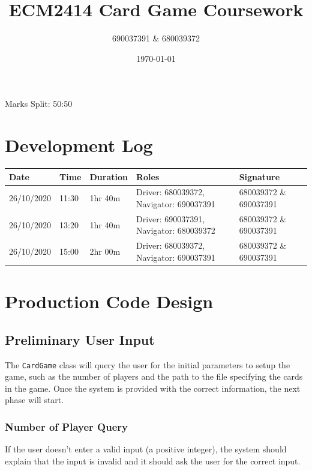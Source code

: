 \documentclass[a4paper, 11pt] {article}
\begin{document}
\title{ECM2414 Card Game Coursework}
\author{690037391 \& 680039372}
\date{\today}
\maketitle
	\begin{center}
		Marks Split: 50:50
	\end{center}
\pagebreak
\section*{Development Log}
\begin{center}
\begin{table}[H]
\begin{tabular}{|l|l|l|l|l|}
\hline
Date           & Time     & Duration  & Roles                                                 & Signature                       \\ \hline
 26/10/2020 & 11:30    & 1hr 40m  & Driver: 680039372, Navigator: 690037391 & 680039372 \& 690037391 \\ \hline
 26/10/2020 & 13:20    & 1hr 40m  & Driver: 690037391, Navigator: 680039372 & 680039372 \& 690037391 \\ \hline
 26/10/2020 & 15:00    & 2hr 00m & Driver: 680039372, Navigator: 690037391 & 680039372 \& 690037391 \\ \hline
\end{tabular}
\end{table}
\end{center}
\FloatBarrier
\pagebreak
\section*{Production Code Design}
\subsection*{Preliminary User Input}
The \texttt{CardGame} class will query the user for the initial parameters to setup the game, such as the number of players and the path to the file specifying the cards in the game. Once the system is provided with the correct information, the next phase will start.
\subsubsection*{Number of Player Query}
If the user doesn't enter a valid input (a positive integer), the system should explain that the input is invalid and it should ask the user for the correct input.
\end{document}
